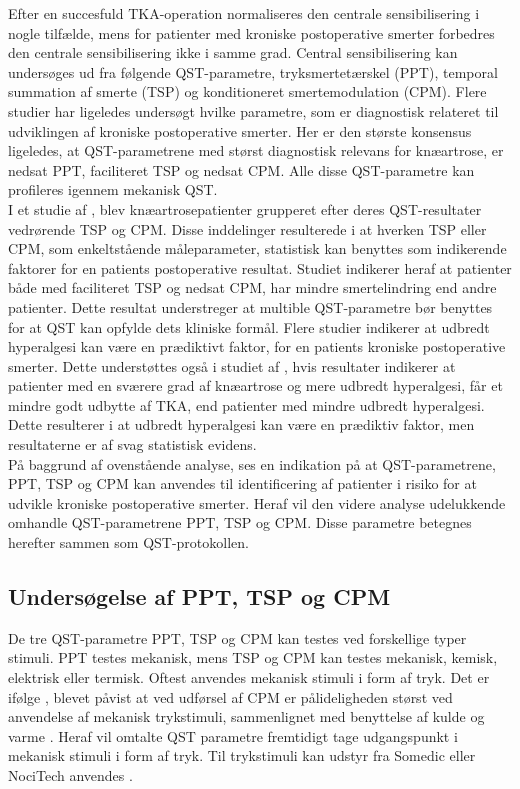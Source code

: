 Efter en succesfuld TKA-operation normaliseres den centrale sensibilisering i nogle tilfælde, mens for patienter med kroniske postoperative smerter forbedres den centrale sensibilisering ikke i samme grad. Central sensibilisering kan undersøges ud fra følgende QST-parametre, tryksmertetærskel (PPT), temporal summation af smerte (TSP) og konditioneret smertemodulation (CPM). \citep{Arendt-Nielsen2015b} Flere studier har ligeledes undersøgt hvilke parametre, som er diagnostisk relateret til udviklingen af kroniske postoperative smerter. Her er den største konsensus ligeledes, at QST-parametrene med størst diagnostisk relevans for knæartrose, er nedsat PPT, faciliteret TSP og nedsat CPM. Alle disse QST-parametre kan profileres igennem mekanisk QST. \citep{Petersen2015} \citep{Petersen2016} \citep{Wylde2015b} \\
I et studie af , blev knæartrosepatienter grupperet efter deres QST-resultater vedrørende TSP og CPM. Disse inddelinger resulterede i at hverken TSP eller CPM, som enkeltstående måleparameter, statistisk kan benyttes som indikerende faktorer for en patients postoperative resultat. Studiet indikerer heraf at patienter både med faciliteret TSP og nedsat CPM, har mindre smertelindring end andre patienter. Dette resultat understreger at multible QST-parametre bør benyttes for at QST kan opfylde dets kliniske formål. \citep{Petersen2016} Flere studier indikerer at udbredt hyperalgesi kan være en prædiktivt faktor, for en patients kroniske postoperative smerter. \citep{Petersen2016} \citep{Wylde2013} Dette understøttes også i studiet af , hvis resultater indikerer at patienter med en sværere grad af knæartrose og mere udbredt hyperalgesi, får et mindre godt udbytte af TKA, end patienter med mindre udbredt hyperalgesi. Dette resulterer i at udbredt hyperalgesi kan være en prædiktiv faktor, men resultaterne er af svag statistisk evidens. \citep{Wylde2016c}\\
På baggrund af ovenstående analyse, ses en indikation på at QST-parametrene, PPT, TSP og CPM kan anvendes til identificering af patienter i risiko for at udvikle kroniske postoperative smerter. Heraf vil den videre analyse udelukkende omhandle QST-parametrene PPT, TSP og CPM. Disse parametre betegnes herefter sammen som QST-protokollen. 

\subsection{Undersøgelse af PPT, TSP og CPM}
De tre QST-parametre PPT, TSP og CPM kan testes ved forskellige typer stimuli. PPT testes mekanisk, mens TSP og CPM kan testes mekanisk, kemisk, elektrisk eller termisk. Oftest anvendes mekanisk stimuli i form af tryk. \citep{Suokas2012} \citep{Yarnitsky2006} Det er ifølge \citep{Imai2016}, blevet påvist at ved udførsel af CPM er pålideligheden størst ved anvendelse af mekanisk trykstimuli, sammenlignet med benyttelse af kulde og varme \citep{Imai2016}. Heraf vil omtalte QST parametre fremtidigt tage udgangspunkt i mekanisk stimuli i form af tryk. Til trykstimuli kan udstyr fra Somedic eller NociTech anvendes \citep{Wylde2015b} \citep{Petersen2016}. 


